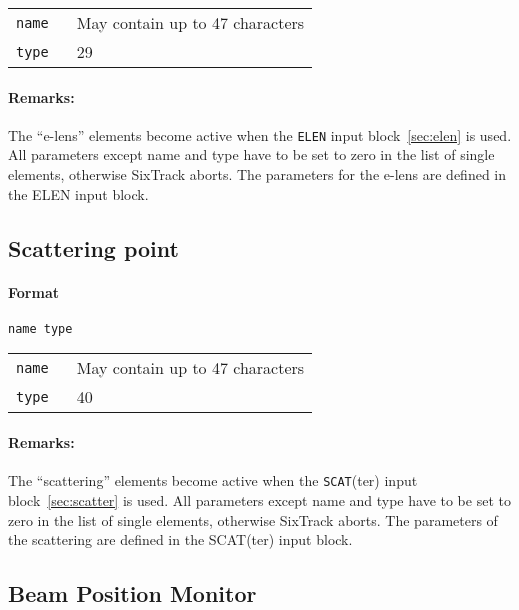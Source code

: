 \bigskip
\begin{tabular}{@{}lp{0.8\linewidth}}
    \texttt{name} & May contain up to 47 characters \\
    \texttt{type} & 29
\end{tabular}

\paragraph{Remarks:}
The ``e-lens'' elements become active when the \texttt{ELEN} input block~\ref{sec:elen} is used.
All parameters except name and type have to be set to zero in the list of single elements, otherwise SixTrack aborts.
The parameters for the e-lens are defined in the ELEN input block.

\subsection{Scattering point} \label{SCAT}

\paragraph{Format} \texttt{name type}

\bigskip
\begin{tabular}{@{}lp{0.8\linewidth}}
    \texttt{name} & May contain up to 47 characters \\
    \texttt{type} & 40
\end{tabular}

\paragraph{Remarks:}
The ``scattering'' elements become active when the \texttt{SCAT}(ter) input block~\ref{sec:scatter} is used.
All parameters except name and type have to be set to zero in the list of single elements, otherwise SixTrack aborts.
The parameters of the scattering are defined in the SCAT(ter) input block.

\subsection{Beam Position Monitor} \label{BPM}


